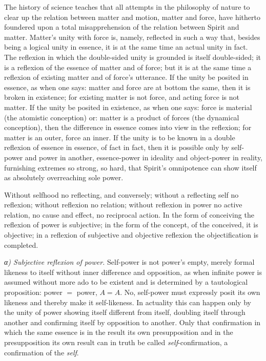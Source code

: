 \documentclass[12pt,a4paper]{book}
\newcommand{\subrunin}[1]{\emph{#1}\hspace{0.4em}}
\begin{document}
The history of science teaches that all attempts in the philosophy of nature to
clear up the relation between matter and motion, matter and force, have hitherto
foundered upon a total misapprehension of the relation between Spirit and matter.
Matter's unity with force is, namely, reflected in such a way that, besides being a
logical unity in essence, it is at the same time an actual unity in fact. The
reflexion in which the double-sided unity is grounded is itself double-sided; it is
a reflexion of the essence of matter and of force; but it is at the same time a
reflexion of existing matter and of force's utterance. If the unity be posited in
essence, as when one says: matter and force are at bottom the same, then it is
broken in existence; for existing matter is not force, and acting force is not
matter. If the unity be posited in existence, as when one says: force is material
(the atomistic conception) or: matter is a product of forces (the dynamical
conception), then the difference in essence comes into view in the reflexion; for
matter is an outer, force an inner. If the unity is to be known in a double
reflexion of essence in essence, of fact in fact, then it is possible only by
self-power and power in another,
essence-power in ideality and object-power in reality, furnishing extremes so
strong, so hard, that Spirit's omnipotence can show itself as absolutely
overreaching sole power.

Without selfhood no reflecting, and conversely; without a reflecting self no
reflexion; without reflexion no relation; without reflexion in power no active
relation, no cause and effect, no reciprocal action. In the form of conceiving the
reflexion of power is subjective; in the form of the concept, of the conceived, it
is objective; in a reflexion of subjective and objective reflexion the
objectification is completed.

\subrunin{α) Subjective reflexion of power.} Self-power is not power's empty,
merely formal likeness to itself without inner difference and opposition, as when
infinite power is assumed without more ado to be existent and is determined by a
tautological proposition: power $=$ power, $A = A$. No, self-power must expressly
posit its own likeness and thereby make it self-likeness. In actuality this can
happen only by the unity of power showing itself different from itself, doubling
itself through another and confirming itself by opposition to another. Only that
confirmation in which the same essence is in the result its own presupposition and
in the presupposition its own result can in truth be called \emph{self}-confirmation,
a confirmation of the \emph{self}.
\end{document}
